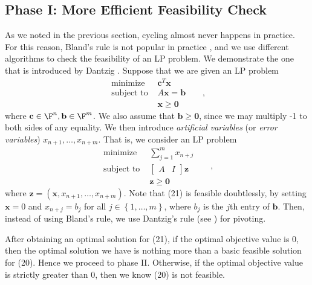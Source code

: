 \documentclass{article}
\renewcommand{\vec}{\mathbf}
\begin{document}
\subsection{Phase I: More Efficient Feasibility Check}

As we noted in the previous section, cycling almost never happens in practice. For this reason, Bland's rule is not popular in practice \cite{UULP}, and we use different algorithms to check the feasibility of an LP problem. We demonstrate the one that is introduced by Dantzig \cite{LPE}. Suppose that we are given an LP problem
\begin{equation}
    \begin{aligned}
        \text{minimize } & \vec{c}^{T}\vec{x} && \\
        \text{subject to } & A\vec{x}=\vec{b} && \\  
                           & \vec{x}\geq\vec{0}
    \end{aligned},
\end{equation}
where $\vec{c}\in\F^n, \vec{b}\in\F^m$. We also assume that $\vec{b}\geq\vec{0}$, since we may multiply -1 to both sides of any equality. We then introduce \textit{artificial variables} (or \textit{error variables}) $x_{n+1},\ldots,x_{n+m}$. That is, we consider an LP problem
\begin{equation}
    \begin{aligned}
        \text{minimize } & \sum^{m}_{j=1} x_{n+j} && \\
        \text{subject to } &  \begin{bmatrix} A&I \end{bmatrix} \vec{z} && \\
                           & \vec{z}\geq\vec{0}
    \end{aligned},
\end{equation}
where $\vec{z}=\left( \vec{x},x_{n+1},\ldots,x_{n+m} \right) $. Note that (21) is feasible doubtlessly, by setting $\vec{x}=0$ and $x_{n+j}=b_j$ for all $j\in\left\lbrace 1,\ldots,m \right\rbrace$, where $b_j$ is the $j$th entry of $\vec{b}$. Then, instead of using Bland's rule, we use Dantzig's rule (see \cite{LPE}) for pivoting. 

After obtaining an optimal solution for (21), if the optimal objective value is 0, then the optimal solution we have is nothing more than a basic feasible solution for (20). Hence we proceed to phase II. Otherwise, if the optimal objective value is strictly greater than 0, then we know (20) is not feasible.
\end{document}
